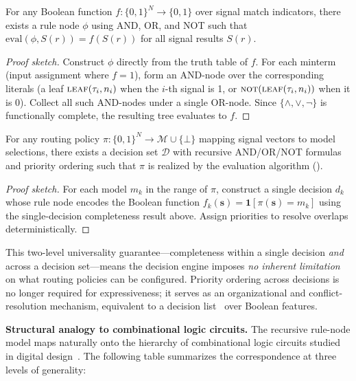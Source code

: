 \begin{proposition}
For any Boolean function $f: \{0,1\}^N \to \{0,1\}$ over signal match indicators, there exists a rule node $\phi$ using AND, OR, and NOT such that $\text{eval}(\phi, S(r)) = f(S(r))$ for all signal results $S(r)$.
\end{proposition}

\begin{proof}[Proof sketch]
Construct $\phi$ directly from the truth table of $f$.
For each minterm (input assignment where $f = 1$), form an AND-node over the corresponding literals (a leaf $\textsc{leaf}(\tau_i, n_i)$ when the $i$-th signal is 1, or $\textsc{not}(\textsc{leaf}(\tau_i, n_i))$ when it is 0).
Collect all such AND-nodes under a single OR-node.
Since $\{\wedge, \vee, \neg\}$ is functionally complete, the resulting tree evaluates to $f$.
\end{proof}

\begin{proposition}
For any routing policy $\pi: \{0,1\}^N \to \mathcal{M} \cup \{\bot\}$ mapping signal vectors to model selections, there exists a decision set $\mathcal{D}$ with recursive AND/OR/NOT formulas and priority ordering such that $\pi$ is realized by the evaluation algorithm ().
\end{proposition}

\begin{proof}[Proof sketch]
For each model $m_k$ in the range of $\pi$, construct a single decision $d_k$ whose rule node encodes the Boolean function $f_k(\mathbf{s}) = \mathbf{1}[\pi(\mathbf{s}) = m_k]$ using the single-decision completeness result above.
Assign priorities to resolve overlaps deterministically.
\end{proof}

This two-level universality guarantee---completeness within a single decision \emph{and} across a decision set---means the decision engine imposes \emph{no inherent limitation} on what routing policies can be configured.
Priority ordering across decisions is no longer required for expressiveness; it serves as an organizational and conflict-resolution mechanism, equivalent to a decision list~\cite{rivest1987learning} over Boolean features.

\noindent\textbf{Structural analogy to combinational logic circuits.}
The recursive rule-node model maps naturally onto the hierarchy of combinational logic circuits studied in digital design~\cite{brayton1984logic}.
The following table summarizes the correspondence at three levels of generality:


